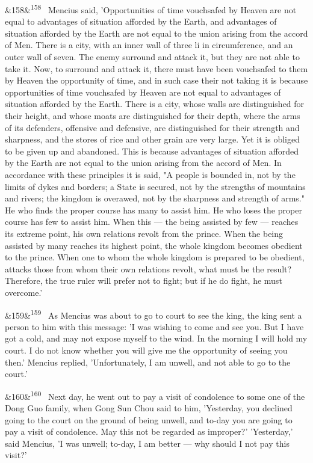 \documentclass[12pt]{article}
\newcommand{\para}[1][]{\par\noindent\ifx&#1&\else\textsuperscript{\footnotesize #1}~\fi}
\begin{document}
\para[158] Mencius said, 'Opportunities of time vouchsafed by Heaven are not equal to advantages of situation afforded by the Earth, and advantages of situation afforded by the Earth are not equal to the union arising from the accord of Men. There is a city, with an inner wall of three li in circumference, and an outer wall of seven. The enemy surround and attack it, but they are not able to take it. Now, to surround and attack it, there must have been vouchsafed to them by Heaven the opportunity of time, and in such case their not taking it is because opportunities of time vouchsafed by Heaven are not equal to advantages of situation afforded by the Earth. There is a city, whose walls are distinguished for their height, and whose moats are distinguished for their depth, where the arms of its defenders, offensive and defensive, are distinguished for their strength and sharpness, and the stores of rice and other grain are very large. Yet it is obliged to be given up and abandoned. This is because advantages of situation afforded by the Earth are not equal to the union arising from the accord of Men. In accordance with these principles it is said, "A people is bounded in, not by the limits of dykes and borders; a State is secured, not by the strengths of mountains and rivers; the kingdom is overawed, not by the sharpness and strength of arms." He who finds the proper course has many to assist him. He who loses the proper course has few to assist him. When this --- the being assisted by few --- reaches its extreme point, his own relations revolt from the prince. When the being assisted by many reaches its highest point, the whole kingdom becomes obedient to the prince. When one to whom the whole kingdom is prepared to be obedient, attacks those from whom their own relations revolt, what must be the result? Therefore, the true ruler will prefer not to fight; but if he do fight, he must overcome.'

\para[159] As Mencius was about to go to court to see the king, the king sent a person to him with this message: 'I was wishing to come and see you. But I have got a cold, and may not expose myself to the wind. In the morning I will hold my court. I do not know whether you will give me the opportunity of seeing you then.' Mencius replied, 'Unfortunately, I am unwell, and not able to go to the court.'

\para[160] Next day, he went out to pay a visit of condolence to some one of the Dong Guo family, when Gong Sun Chou said to him, 'Yesterday, you declined going to the court on the ground of being unwell, and to-day you are going to pay a visit of condolence. May this not be regarded as improper?' 'Yesterday,' said Mencius, 'I was unwell; to-day, I am better --- why should I not pay this visit?'
\end{document}
